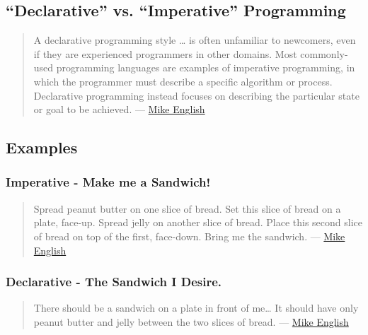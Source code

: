 \subsection{``Declarative'' vs. ``Imperative'' Programming}

\begin{quote}
A declarative programming style \ldots{} is often unfamiliar to newcomers, even
if they are experienced programmers in other domains. Most commonly-used
programming languages are examples of imperative programming, in
which the programmer must describe a specific algorithm or process.
Declarative programming instead focuses on describing the particular
state or goal to be achieved.
--- \href{http://spin.atomicobject.com/2012/09/13/from-imperative-to-declarative-system-configuration-with-puppet/}{Mike English}
\end{quote}





\subsection{Examples}

\subsubsection{Imperative - Make me a Sandwich!}

\begin{quote}
Spread peanut butter on one slice of bread. Set this slice of bread on a plate, face-up. Spread jelly on another slice of bread. Place this second slice of bread on top of the first, face-down. Bring me the sandwich.
--- \href{http://spin.atomicobject.com/2012/09/13/from-imperative-to-declarative-system-configuration-with-puppet/}{Mike English}
\end{quote}

\subsubsection{Declarative - The Sandwich I Desire.}

\begin{quote}
There should be a sandwich on a
plate in front of me\ldots{} It should have only peanut butter and jelly
between the two slices of bread.
--- \href{http://spin.atomicobject.com/2012/09/13/from-imperative-to-declarative-system-configuration-with-puppet/}{Mike English}
\end{quote}





